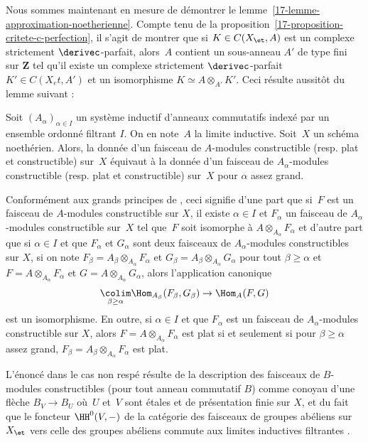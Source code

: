 \documentclass[10pt]{../fichiers-configuration-latex/smfart}
\begin{document}
\bigskip

Nous sommes maintenant en mesure de démontrer le
lemme~\ref{17-lemme-approximation-noetherienne}. Compte tenu de la
proposition~\ref{17-proposition-critete-c-perfection}, il s'agit de montrer
que si $K\in C(X_\et,A)$ est un complexe strictement $\derivec$-parfait,
alors $A$ contient un sous-anneau $A'$ de type fini sur $\mathbf{Z}$ tel
qu'il existe un complexe strictement $\derivec$-parfait $K'\in C(X_et,A')$
et un isomorphisme $K\simeq A\otimes_{A'} K'$. Ceci résulte aussitôt du
lemme suivant :

\begin{lemme2}
Soit $(A_\alpha)_{\alpha\in I}$ un système inductif d'anneaux commutatifs
indexé par un ensemble ordonné filtrant $I$. On en note $A$ la limite
inductive. Soit $X$ un schéma noethérien. Alors, la donnée d'un faisceau de
$A$-modules constructible (resp. plat et constructible) sur $X$ équivaut à
la donnée d'un faisceau de $A_\alpha$-modules constructible (resp. plat et
constructible) sur $X$ pour $\alpha$ assez grand.
\end{lemme2}

Conformément aux grands principes de ,
ceci signifie d'une part que si $F$ est un faisceau de $A$-modules
constructible sur $X$, il existe $\alpha\in I$ et $F_\alpha$ un faisceau de
$A_\alpha$-modules constructible sur $X$ tel que $F$ soit isomorphe à
$A\otimes_{A_\alpha} F_\alpha$ et d'autre part que si $\alpha\in I$ et que
$F_\alpha$ et $G_\alpha$ sont deux faisceaux de $A_\alpha$-modules
constructibles sur $X$, si on note
$F_\beta=A_\beta\otimes_{A_\alpha}F_\alpha$ et
$G_\beta=A_\beta\otimes_{A_\alpha}G_\alpha$ pour tout $\beta\geq \alpha$ et
$F=A\otimes_{A_\alpha}F_\alpha$ et $G=A\otimes_{A_\alpha}G_\alpha$, alors
l'application canonique
\[\underset{\beta\geq \alpha}\colim \Hom_{A_\beta}(F_\beta,G_\beta)\to
\Hom_A(F,G)\]
est un isomorphisme. En outre, si $\alpha\in I$ et que $F_\alpha$ est un
faisceau de $A_\alpha$-modules constructible sur $X$, alors
$F=A\otimes_{A_\alpha}F_\alpha$ est plat si et seulement si pour $\beta\geq
\alpha$ assez grand, $F_\beta=A_{\beta}\otimes_{A_\alpha} F_\alpha$ est
plat.

L'énoncé dans le cas non respé résulte de la description des faisceaux de
$B$-modules constructibles (pour tout anneau commutatif $B$) comme conoyau
d'une flèche $B_V\to B_U$ où $U$ et $V$ sont étales et de présentation
finie sur $X$, et du fait que le foncteur $\HH^0(V,-)$ de la catégorie des
faisceaux de groupes abéliens sur $X_\et$ vers celle des groupes abéliens
commute aux limites inductives filtrantes .
\end{document}
